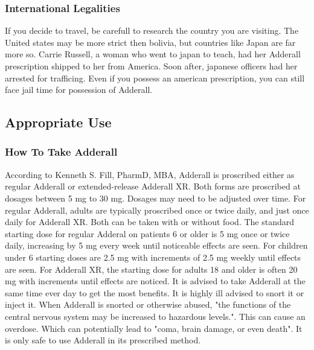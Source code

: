 \documentclass{article}
\begin{document}
                
            \subsubsection{International Legalities}
                If you decide to travel, be carefull to research the country you are visiting. The United states may be more strict then bolivia, but countries like Japan are far more so. Carrie Russell, a woman who went to japan to teach, had her Adderall prescription shipped to her from America. Soon after, japanese officers had her arrested for trafficing\cite{ore15}. Even if you possess an american prescription, you can still face jail time for possession of Adderall. 
                
                
        \subsection{Appropriate Use}
            \subsubsection{How To Take Adderall}
                According to Kenneth S. Fill, PharmD, MBA\cite{fill22}, Adderall is proscribed either as regular Adderall or extended-release Adderall XR. Both forms are proscribed at dosages between 5 mg to 30 mg. Dosages may need to be adjusted over time. For regular Adderall, adults are typically proscribed once or twice daily, and just once daily for Adderall XR. Both can be taken with or without food.
                The standard starting dose for regular Adderal on patients 6 or older is 5 mg once or twice daily, increasing by 5 mg every week until noticeable effects are seen. For children under 6 starting doses are 2.5 mg with increments of 2.5 mg weekly until effects are seen.
                For Adderall XR, the starting dose for adults 18 and older is often 20 mg with increments until effects are noticed.
                It is advised to take Adderall at the same time ever day to get the most benefits.
                It is highly ill advised to snort it or inject it. When Adderall is snorted or otherwise abused, "the functions of the central nervous system may be increased to hazardous levels."\cite{scot22}. This can cause an overdose. Which can potentially lead to "coma, brain damage, or even death"\cite{scot22}. It is only safe to use Adderall in its prescribed method.
                
\end{document}
